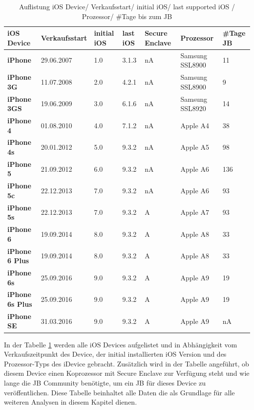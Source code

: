 \begin{table}[htp!]
    \begin{center}
        \begin{tabular}{|p{30mm}|p{27mm}|p{12mm}|p{10mm}|p{18mm}|p{2cm}|p{15mm}|} \hline
            \textbf{iOS Device} & \textbf{Verkaufsstart} & \textbf{initial iOS} & \textbf{last iOS} & \textbf{Secure Enclave} & \textbf{Prozessor}  & \textbf{\#Tage JB} \\ \hline
            \textbf{iPhone} & 29.06.2007  & 1.0 & 3.1.3 & nA & Samsung SSL8900 & 11\\ \hline
            \textbf{iPhone 3G} & 11.07.2008 & 2.0 & 4.2.1 & nA & Samsung SSL8900 & 9\\ \hline
            \textbf{iPhone 3GS} & 19.06.2009 & 3.0 & 6.1.6 & nA & Samsung SSL8920 & 14\\ \hline
            \textbf{iPhone 4} & 01.08.2010 & 4.0 & 7.1.2 & nA & Apple A4 & 38 \\ \hline
            \textbf{iPhone 4s} & 20.01.2012 & 5.0 & 9.3.2 & nA & Apple A5 & 98 \\ \hline 
            \textbf{iPhone 5} & 21.09.2012 & 6.0 &  9.3.2 & nA & Apple A6 & 136 \\ \hline
            \textbf{iPhone 5c} & 22.12.2013 & 7.0 & 9.3.2 & nA & Apple A6 & 93 \\ \hline
            \textbf{iPhone 5s} & 22.12.2013 & 7.0 & 9.3.2 & A & Apple A7 & 93 \\ \hline
            \textbf{iPhone 6} & 19.09.2014 & 8.0 & 9.3.2 & A & Apple A8 & 33\\ \hline
            \textbf{iPhone 6 Plus} & 19.09.2014 & 8.0 & 9.3.2 &  A & Apple A8 & 33\\ \hline
            \textbf{iPhone 6s} & 25.09.2016 & 9.0 &  9.3.2 & A & Apple A9 & 19\\ \hline
            \textbf{iPhone 6s Plus} & 25.09.2016 & 9.0 & 9.3.2 &  A & Apple A9 & 19\\ \hline
            \textbf{iPhone SE} & 31.03.2016 & 9.0 &  9.3.2 & A & Apple A9 & nA\\ \hline  
        \end{tabular} 
        \caption{Auflistung iOS Device/ Verkaufsstart/ initial iOS/ last supported iOS / Prozessor/ \#Tage bis zum JB}
        \label{tab:iOSHW}
    \end{center}
\end{table}

In der Tabelle \ref{tab:iOSHW} werden alle iOS Devices aufgelistet und  in Abhängigkeit vom Verkaufszeitpunkt des Device, der initial installierten iOS Version und des Prozessor-Typs des iDevice gebracht. Zusätzlich wird in der Tabelle angeführt, ob diesem Device einen Koprozessor mit Secure Enclave zur Verfügung steht und wie lange die JB Community benötigte, um ein JB für dieses Device zu veröffentlichen. Diese Tabelle beinhaltet alle Daten die als Grundlage für alle weiteren Analysen in diesem Kapitel dienen.\par


